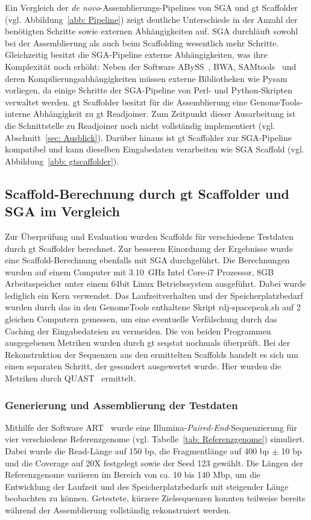 \documentclass[a4paper,11pt,parskip,abstract=on]{scrartcl}
\begin{document}
Ein Vergleich der \textit{de novo}-Assemblierungs-Pipelines von SGA und gt
Scaffolder (vgl. Abbildung~\ref{abb: Pipeline}) zeigt deutliche Unterschiede
in der Anzahl der benötigten Schritte sowie externen Abhängigkeiten auf.
SGA durchläuft sowohl bei der Assemblierung als auch beim Scaffolding wesentlich
mehr Schritte. Gleichzeitig besitzt die SGA-Pipeline externe Abhängigkeiten,
was ihre Komplexität noch erhöht: Neben der Software ABySS~\cite{abyss}, BWA,
SAMtools~\cite{Li:2009st} und deren Kompilierungsabhängigkeiten müssen externe
Bibliotheken wie Pysam vorliegen, da einige Schritte der SGA-Pipeline von Perl-
und Python-Skripten verwaltet werden.
gt Scaffolder besitzt für die Assemblierung eine GenomeTools-interne
Abhängigkeit zu gt Readjoiner. Zum Zeitpunkt dieser Ausarbeitung ist die
Schnittstelle zu Readjoiner noch nicht vollständig implementiert
(vgl. Abschnitt~\ref{sec: Ausblick}). Darüber hinaus ist gt Scaffolder zur
SGA-Pipeline kompatibel und kann dieselben Eingabedaten verarbeiten wie
SGA Scaffold (vgl. Abbildung~\ref{abb: gtscaffolder}).

\subsection{Scaffold-Berechnung durch gt Scaffolder und SGA im Vergleich}
Zur Überprüfung und Evaluation wurden Scaffolds für verschiedene Testdaten durch
gt Scaffolder berechnet. Zur besseren Einordnung der Ergebnisse wurde eine
Scaffold-Berechnung ebenfalls mit SGA durchgeführt. Die Berechnungen wurden auf
einem Computer mit 3.10~GHz Intel Core-i7 Prozessor, 8GB Arbeitsspeicher unter
einem 64bit Linux Betriebssystem ausgeführt. Dabei wurde lediglich ein Kern
verwendet. Das Laufzeitverhalten und der Speicherplatzbedarf wurden durch das
in den
GenomeTools enthaltene Skript rdj-spacepeak.sh auf 2 gleichen Computern
gemessen, um eine eventuelle Verfälschung durch das
Caching der Eingabedateien zu vermeiden. Die von beiden Programmen ausgegebenen
Metriken wurden durch gt seqstat nochmals überprüft. Bei der
Rekonstruktion der Sequenzen aus den ermittelten Scaffolds handelt es sich um
einen separaten Schritt, der gesondert ausgewertet wurde. Hier wurden die
Metriken durch QUAST~\cite{Gurevich:2013je} ermittelt.

\subsubsection*{Generierung und Assemblierung der Testdaten}
\label{sec: Testdaten}
Mithilfe der Software ART~\cite{Huang:2012kq} wurde eine
Illumina-\textit{Paired-End}-Sequenzierung für vier verschiedene Referenzgenome
(vgl. Tabelle~\ref{tab: Referenzgenome}) simuliert. Dabei wurde die Read-Länge
auf 150 bp, die Fragmentlänge auf 400 bp $\pm$ 10 bp und die Coverage auf
20X festgelegt sowie der Seed 123 gewählt. Die Längen der Referenzgenome
variieren im Bereich von ca. 10 bis 140 Mbp, um die Entwicklung der Laufzeit
und des Speicherplatzbedarfs mit steigender Länge beobachten zu können.
Getestete, kürzere Zielsequenzen konnten teilweise bereits während der
Assemblierung vollständig rekonstruiert werden.
\end{document}
